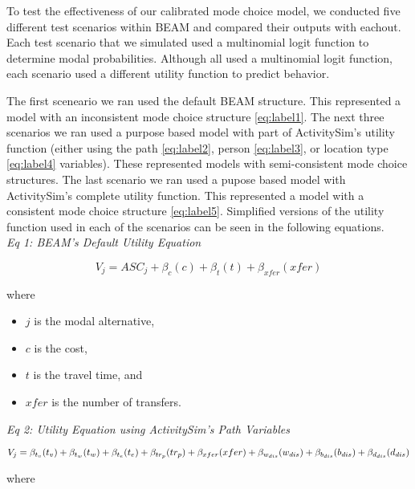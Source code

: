 \documentclass[3p, authoryear]{elsarticle} %
\providecommand{\tightlist}{%
  \setlength{\itemsep}{0pt}\setlength{\parskip}{0pt}}
\begin{document}
To test the effectiveness of our calibrated mode choice model, we conducted five different test scenarios within BEAM and compared their outputs with eachout. Each test scenario that we simulated used a multinomial logit function to determine modal probabilities. Although all used a multinomial logit function, each scenario used a different utility function to predict behavior.

The first sceneario we ran used the default BEAM structure. This represented a model with an inconsistent mode choice structure \eqref{eq:label1}. The next three scenarios we ran used a purpose based model with part of ActivitySim's utility function (either using the path \eqref{eq:label2}, person \eqref{eq:label3}, or location type \eqref{eq:label4} variables). These represented models with semi-consistent mode choice structures. The last scenario we ran used a pupose based model with ActivitySim's complete utility function. This represented a model with a consistent mode choice structure \eqref{eq:label5}. Simplified versions of the utility function used in each of the scenarios can be seen in the following equations.\\

\emph{Eq 1: BEAM's Default Utility Equation}

\begin{equation}
  V_j = ASC_j + \beta_{c}(c) + \beta_{t}(t) + \beta_{xfer}(xfer) \label{eq:label1}
\end{equation}

where

\begin{itemize}
\tightlist
\item
  \(j\) is the modal alternative,
\item
  \(c\) is the cost,
\item
  \(t\) is the travel time, and
\item
  \(xfer\) is the number of transfers.
\end{itemize}

\emph{Eq 2: Utility Equation using ActivitySim's Path Variables}

\begin{equation}
  V_j = \beta_{t_v}(t_v) + \beta_{t_w}(t_w) + \beta_{t_e}(t_e) + \beta_{tr_p}(tr_p) + \beta_{xfer}(xfer) + \beta_{w_{dis}}(w_{dis}) + \\ \beta_{b_{dis}}(b_{dis}) + \beta_{d_{dis}}(d_{dis}) \label{eq:label2}
\end{equation}

where
\end{document}
